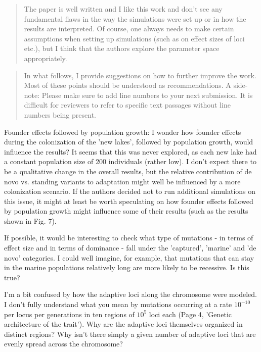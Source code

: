\begin{quote}
    The paper is well written and I like this work and don't see any
    fundamental flaws in the way the simulations were set up or in how the results
    are interpreted. Of course, one always needs to make certain assumptions when
    setting up simulations (such as on effect sizes of loci etc.), but I think that
    the authors explore the parameter space appropriately. 
\end{quote}

\begin{quote}
    In what follows, I provide suggestions on how to further improve the work. Most
    of these points should be understood as recommendations. A side-note:
    Please make sure to add line numbers to your next submission. It is
    difficult for reviewers to refer to specific text passages without line
    numbers being present.
\end{quote}

\begin{point}{}
Founder effects followed by population growth: I wonder how founder effects during the colonization of the 'new lakes', followed by population growth, would influence the results? It seems that this was never explored, as each new lake had a constant population size of 200 individuals (rather low). I don't expect there to be a qualitative change in the overall results, but the relative contribution of de novo vs. standing variants to adaptation might well be influenced by a more colonization scenario. If the authors decided not to run additional simulations on this issue, it might at least be worth speculating on how founder effects followed by population growth might influence some of their results (such as the results shown in Fig. 7).
\end{point}

\reply{
}

\begin{point}{}
If possible, it would be interesting to check what type of mutations - in terms of effect size and in terms of dominance - fall under the 'captured', 'marine' and 'de novo' categories. I could well imagine, for example, that mutations that can stay in the marine populations relatively long are more likely to be recessive. Is this true?
\end{point}

\reply{
}

\begin{point}{}
I'm a bit confused by how the adaptive loci along the chromosome were modeled. I don't fully understand what you mean by mutations occurring at a rate $10^{-10}$ per locus per generations in ten regions of $10^5$ loci each (Page 4, 'Genetic architecture of the trait'). Why are the adaptive loci themselves organized in distinct regions? Why isn't there simply a given number of adaptive loci that are evenly spread across the chromosome?
\end{point}

